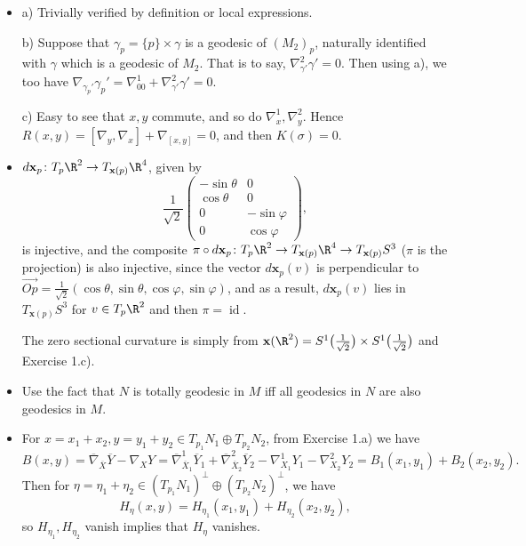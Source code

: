 \begin{itemize}
    \item[1.] a) Trivially verified by definition or local expressions.

    b) Suppose that $\gamma_p=\{p\}\times\gamma$ is a geodesic of $(M_2)_p$, 
    naturally identified with $\gamma$ which is a geodesic of $M_2$. 
    That is to say, $\nabla^2_{\gamma'}\gamma'=0$. Then using a), we too have
    $\nabla_{\gamma_p'}\gamma_p'=\nabla^1_00+\nabla^2_{\gamma'}\gamma'=0$.

    c) Easy to see that $x,y$ commute, and so do $\nabla^1_x,\nabla^2_y$. 
    Hence $R(x,y)=[\nabla_y,\nabla_x]+\nabla_{[x,y]}=0$, and then $K(\sigma)=0$.

    \item[2.] $d\mathbf{x}_p\colon T_p\R^2 \to T_{\mathbf{x}(p)}\R^4$, given by
    \[\frac{1}{\sqrt{2}}\begin{pmatrix}
        -\sin\theta&0\\\cos\theta&0\\0&-\sin\varphi\\0&\cos\varphi
    \end{pmatrix},\]
    is injective, and the composite $\pi \circ d\mathbf{x}_p\colon T_p\R^2 
    \to T_{\mathbf{x}(p)}\R^4 \to T_{\mathbf{x}(p)}S^3$ ($\pi$ is the projection) 
    is also injective, since the vector $d\mathbf{x}_p(v)$ is perpendicular to 
    $\overrightarrow{Op}=\frac{1}{\sqrt{2}}(\cos\theta,\sin\theta,\cos\varphi,\sin\varphi)$, 
    and as a result, $d\mathbf{x}_p(v)$ lies in $T_{\mathbf{x}(p)}S^3$ 
    for $v\in T_p\R^2$ and then $\pi=\operatorname{id}$.

    The zero sectional curvature is simply from $\mathbf{x}(\R^2)
    =S^1\big(\frac{1}{\sqrt{2}}\big) \times S^1\big(\frac{1}{\sqrt{2}}\big)$ 
    and Exercise 1.c).

    \item[3.] Use the fact that $N$ is totally geodesic in $M$ 
    iff all geodesics in $N$ are also geodesics in $M$.

    \item[4.] For $x=x_1+x_2,y=y_1+y_2\in T_{p_1}N_1 \oplus T_{p_2}N_2$, 
    from Exercise 1.a) we have
    \[B(x,y)=\overline{\nabla}_{\overline{X}}\overline{Y}-\nabla_XY
    =\overline{\nabla}^1_{\overline{X}_1}\overline{Y}_1
    +\overline{\nabla}^2_{\overline{X}_2}\overline{Y}_2
    -\nabla^1_{X_1}Y_1-\nabla^2_{X_2}Y_2=B_1(x_1,y_1)+B_2(x_2,y_2).\]
    Then for $\eta=\eta_1+\eta_2\in(T_{p_1}N_1)^\perp\oplus(T_{p_2}N_2)^\perp$,
    we have\[H_\eta(x,y)=H_{\eta_1}(x_1,y_1)+H_{\eta_2}(x_2,y_2),\]
    so $H_{\eta_1},H_{\eta_2}$ vanish implies that $H_\eta$ vanishes.


\end{itemize}
